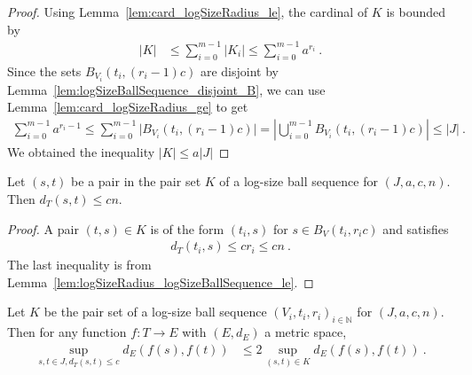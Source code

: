 \begin{proof}
  \leanok
Using Lemma~\ref{lem:card_logSizeRadius_le}, the cardinal of $K$ is bounded by
\begin{align*}
  \vert K \vert
  &\le \sum_{i=0}^{m-1} \vert K_i \vert
  \le \sum_{i=0}^{m-1} a^{r_i}
  \: .
\end{align*}
Since the sets $B_{V_i}(t_i, (r_i-1)c)$ are disjoint by Lemma~\ref{lem:logSizeBallSequence_disjoint_B}, we can use Lemma~\ref{lem:card_logSizeRadius_ge} to get
\begin{align*}
  \sum_{i=0}^{m-1} a^{r_i - 1}
  \le \sum_{i=0}^{m-1} \vert B_{V_i}(t_i, (r_i-1)c) \vert
  = \left\vert \bigcup_{i=0}^{m-1} B_{V_i}(t_i, (r_i-1)c) \right\vert
  \le \vert J \vert
  \: .
\end{align*}
We obtained the inequality $\vert K \vert \le a \vert J \vert$
\end{proof}


\begin{lemma}\label{lem:dist_le_of_mem_pairSet}
  \leanok
Let $(s, t)$ be a pair in the pair set $K$ of a log-size ball sequence for $(J, a, c, n)$.
Then $d_T(s, t) \le c n$.
\end{lemma}

\begin{proof}
  \leanok
A pair $(t, s) \in K$ is of the form $(t_i, s)$ for $s \in B_V(t_i, r_i c)$ and satisfies
\begin{align*}
  d_T(t_i, s) \le c r_i \le c n \: .
\end{align*}
The last inequality is from Lemma~\ref{lem:logSizeRadius_logSizeBallSequence_le}.
\end{proof}


\begin{lemma}\label{lem:sup_dist_le_two_mul_sup_dist_pairSet}
  \leanok
Let $K$ be the pair set of a log-size ball sequence $(V_i, t_i, r_i)_{i \in \mathbb{N}}$ for $(J, a, c, n)$.
Then for any function $f : T \to E$ with $(E,d_E)$ a metric space,
\begin{align*}
  \sup_{s,t\in J, d_T(s,t) \le c} d_E(f(s), f(t))
  & \le 2 \sup_{(s,t) \in K} d_E(f(s), f(t))
  \: .
\end{align*}
\end{lemma}

